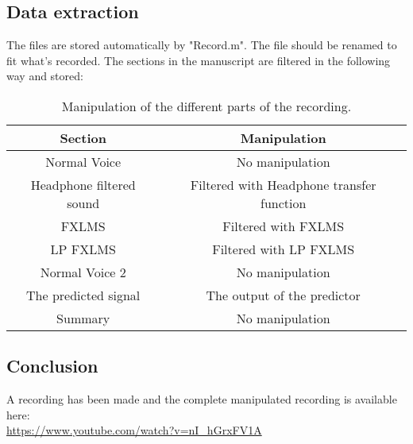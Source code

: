 \subsection{Data extraction}
The files are stored automatically by "Record.m". The file should be renamed to fit what's recorded. 
The sections in the manuscript are filtered in the following way and stored:
\begin{table}[H]
	\centering
	\begin{tabular}{ c c } \toprule
		{Section}				& {Manipulation} \\ \bottomrule 
		Normal Voice			& No manipulation  	\\
		Headphone filtered sound& Filtered with Headphone transfer function \\
		FXLMS					& Filtered with FXLMS	\\
		LP FXLMS 				& Filtered with LP FXLMS	\\
		Normal Voice 2			& No manipulation \\
		The predicted signal 	& The output of the predictor	\\
		Summary 				& No manipulation	\\
		\bottomrule
	\end{tabular}
	\caption{Manipulation of the different parts of the recording.}
	\label{tab:VoiceRecSections}
\end{table}



\subsection{Conclusion}
A recording has been made and the complete manipulated recording is available here: \\
\url{https://www.youtube.com/watch?v=nI_hGrxFV1A} 











